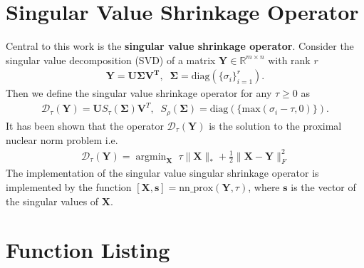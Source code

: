 \documentclass{article}
\DeclareMathOperator*{\argmin}{\mathrm{argmin}}
\begin{document}
\section{Singular Value Shrinkage Operator}

Central to this work is the {\bf{singular value shrinkage operator}}. Consider the singular value decomposition (SVD) of a matrix $\mathbf Y \in \mathbb R^{m \times n}$ with rank $r$
\begin{align}
\mathbf Y = \mathbf{U \Sigma V^T}, \;\; \mathbf \Sigma = \text{diag}(\{\sigma_i\}_{i=1}^r).
\end{align}
Then we define the singular value shrinkage operator for any $\tau \geq 0$ as
\begin{align}
\mathcal D_{\tau}(\mathbf Y) = \mathbf U S_{\tau}(\mathbf \Sigma) \mathbf V^T, \;\; S_{\rho}(\mathbf \Sigma) = \text{diag}(\{\text{max}(\sigma_i - \tau, 0)\}).
\end{align}
It has been shown \cite{cai2010singular} that the operator $\mathcal D_{\tau}(\mathbf Y)$ is the solution to the proximal nuclear norm problem i.e.
\begin{align}
\mathcal D_{\tau}(\mathbf Y) = \argmin_{\mathbf X} \; \tau \| \mathbf X \|_* + \frac{1}{2} \| \mathbf{X - Y} \|_F^2
\end{align}
The implementation of the singular value singular shrinkage operator is implemented by the function $[ \mathbf X, \mathbf s ] = \text{nn\_prox}( \mathbf Y, \tau )$, where $\mathbf s$ is the vector of the singular values of $\mathbf X$.

\section{Function Listing}
\end{document}
